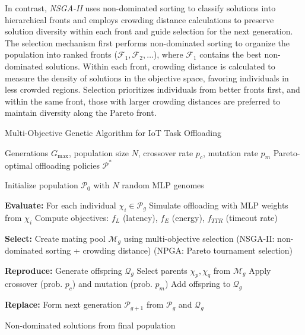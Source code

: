 \documentclass[preprint,12pt]{elsarticle}
\begin{document}
In contrast, \emph{NSGA-II} \cite{Deb2002AFA} uses non-dominated sorting to classify solutions into hierarchical fronts and employs crowding distance calculations to preserve solution diversity within each front and guide selection for the next generation. The selection mechanism first performs non-dominated sorting to organize the population into ranked fronts ($\mathcal{F}_1, \mathcal{F}_2, \ldots$), where $\mathcal{F}_1$ contains the best non-dominated solutions. Within each front, crowding distance is calculated to measure the density of solutions in the objective space, favoring individuals in less crowded regions. Selection prioritizes individuals from better fronts first, and within the same front, those with larger crowding distances are preferred to maintain diversity along the Pareto front.


\begin{algorithm}[H]
\caption{Multi-Objective Genetic Algorithm for IoT Task Offloading}
\label{alg:moega_iot_offloading}
\begin{algorithmic}[1]
\REQUIRE Generations $G_{\max}$, population size $N$, crossover rate $p_c$, mutation rate $p_m$
\ENSURE Pareto-optimal offloading policies $\mathcal{P}^*$

\STATE Initialize population $\mathcal{P}_0$ with $N$ random MLP genomes

    \STATE \textbf{Evaluate:} For each individual $\chi_i \in \mathcal{P}_g$
    \STATE \quad Simulate offloading with MLP weights from $\chi_i$
    \STATE \quad Compute objectives: $f_L$ (latency), $f_E$ (energy), $f_{TTR}$ (timeout rate)
    
    \STATE \textbf{Select:} Create mating pool $\mathcal{M}_g$ using multi-objective selection
    \STATE \quad (NSGA-II: non-dominated sorting + crowding distance)
    \STATE \quad (NPGA: Pareto tournament selection)
    
    \STATE \textbf{Reproduce:} Generate offspring $\mathcal{Q}_g$
        \STATE Select parents $\chi_p, \chi_q$ from $\mathcal{M}_g$
        \STATE Apply crossover (prob. $p_c$) and mutation (prob. $p_m$)
        \STATE Add offspring to $\mathcal{Q}_g$
    \ENDFOR
    
    \STATE \textbf{Replace:} Form next generation $\mathcal{P}_{g+1}$ from $\mathcal{P}_g$ and $\mathcal{Q}_g$
\ENDFOR

\RETURN Non-dominated solutions from final population
\end{algorithmic}
\end{algorithm}
\end{document}
